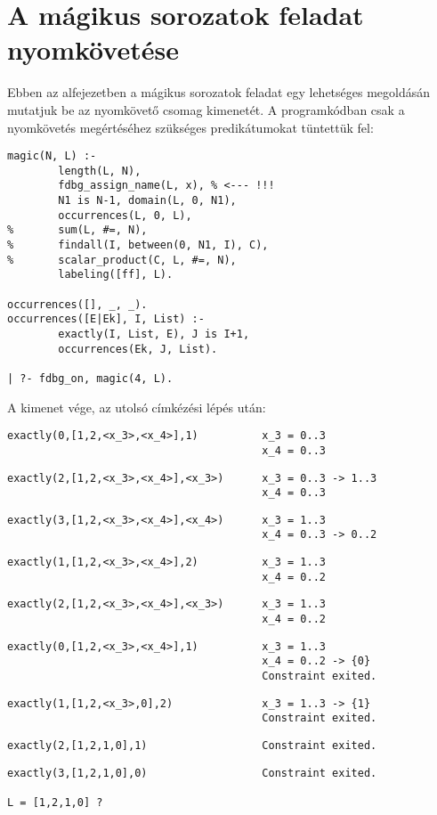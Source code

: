 \section{A mágikus sorozatok feladat nyomkövetése}

Ebben az alfejezetben a mágikus sorozatok feladat egy lehetséges megoldásán
mutatjuk be az \fdbg nyomkövető csomag kimenetét. A programkódban csak a 
nyomkövetés megértéséhez szükséges predikátumokat tüntettük fel:

\begin{verbatim}
magic(N, L) :-
        length(L, N),
        fdbg_assign_name(L, x), % <--- !!!
        N1 is N-1, domain(L, 0, N1),
        occurrences(L, 0, L),
%       sum(L, #=, N),
%       findall(I, between(0, N1, I), C),
%       scalar_product(C, L, #=, N),
        labeling([ff], L).

occurrences([], _, _).
occurrences([E|Ek], I, List) :-
        exactly(I, List, E), J is I+1,
        occurrences(Ek, J, List).

| ?- fdbg_on, magic(4, L).
\end{verbatim}

A kimenet vége, az utolsó címkézési lépés után:

\begin{verbatim}
exactly(0,[1,2,<x_3>,<x_4>],1)          x_3 = 0..3
                                        x_4 = 0..3
\end{verbatim}
\begin{verbatim}
exactly(2,[1,2,<x_3>,<x_4>],<x_3>)      x_3 = 0..3 -> 1..3
                                        x_4 = 0..3        
\end{verbatim}
\begin{verbatim}
exactly(3,[1,2,<x_3>,<x_4>],<x_4>)      x_3 = 1..3        
                                        x_4 = 0..3 -> 0..2
\end{verbatim}
\begin{verbatim}
exactly(1,[1,2,<x_3>,<x_4>],2)          x_3 = 1..3
                                        x_4 = 0..2
\end{verbatim}
\begin{verbatim}
exactly(2,[1,2,<x_3>,<x_4>],<x_3>)      x_3 = 1..3
                                        x_4 = 0..2
\end{verbatim}
\begin{verbatim}
exactly(0,[1,2,<x_3>,<x_4>],1)          x_3 = 1..3        
                                        x_4 = 0..2 -> {0} 
                                        Constraint exited.
\end{verbatim}
\begin{verbatim}
exactly(1,[1,2,<x_3>,0],2)              x_3 = 1..3 -> {1} 
                                        Constraint exited.
\end{verbatim}
\begin{verbatim}
exactly(2,[1,2,1,0],1)                  Constraint exited.
\end{verbatim}
\begin{verbatim}
exactly(3,[1,2,1,0],0)                  Constraint exited.

L = [1,2,1,0] ? 
\end{verbatim}
